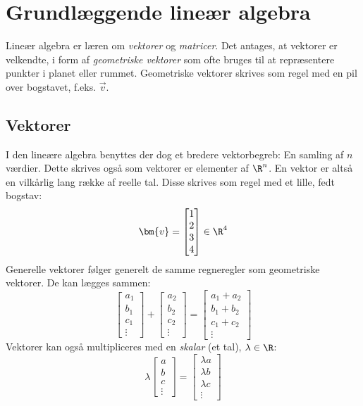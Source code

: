 \documentclass[../SOP.tex]{subfile}
\begin{document}
\section{Grundlæggende lineær algebra}
Lineær algebra er læren om \emph{vektorer} og \emph{matricer}. Det antages, at vektorer er velkendte, i form af \emph{geometriske vektorer} som ofte bruges til at repræsentere punkter i planet eller rummet. Geometriske vektorer skrives som regel med en pil over bogstavet, f.eks. $\vec{v}$. %
\subsection{Vektorer}
I den lineære algebra benyttes der dog et bredere vektorbegreb: En samling af $n$ værdier. Dette skrives også som vektorer er elementer af $\R^n$. En vektor er altså en vilkårlig lang række af reelle tal. Disse skrives som regel med et lille, fedt bogstav:
\begin{equation*}
  \bm{v} = \begin{bmatrix} 1 \\ 2 \\ 3 \\ 4 \end{bmatrix} \in \R^4
\end{equation*}
Generelle vektorer følger generelt de samme regneregler som geometriske vektorer. De kan lægges sammen:
\begin{equation*}
  \begin{bmatrix}
    a_1 \\ b_1 \\ c_1 \\ \vdots
  \end{bmatrix}
  +
  \begin{bmatrix}
   a_2 \\ b_2 \\ c_2 \\ \vdots
  \end{bmatrix}
  =
  \begin{bmatrix}
    a_1+a_2 \\ b_1+b_2 \\ c_1+c_2 \\ \vdots
  \end{bmatrix}
\end{equation*}
Vektorer kan også multipliceres med en \emph{skalar} (et tal), $\lambda\in\R$:
\begin{equation*}
  \lambda 
  \begin{bmatrix}
    a \\ b \\ c \\ \vdots
  \end{bmatrix}
  =
  \begin{bmatrix}
    \lambda a \\ \lambda b \\ \lambda c \\ \vdots
  \end{bmatrix}
\end{equation*}
\end{document}
